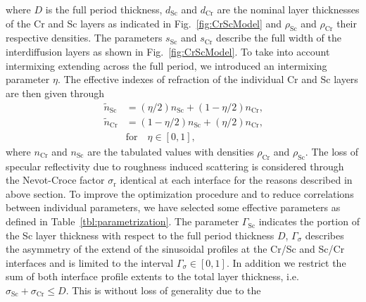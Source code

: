 where $D$ is the full period thickness, $d_\text{Sc}$ and $d_\text{Cr}$ are the nominal layer thicknesses of the Cr and Sc layers as indicated in Fig.~\ref{fig:CrScModel} and $\rho_\text{Sc}$ and $\rho_\text{Cr}$ their respective densities. The parameters $s_\text{Sc}$ and $s_\text{Cr}$ describe the full width of the interdiffusion layers as shown in Fig.~\ref{fig:CrScModel}. To take into account intermixing extending across the full period, we introduced an intermixing parameter $\eta$. The effective indexes of refraction of the individual Cr and Sc layers are then given through
\begin{align}
\tilde{n}_\text{Sc} &=(\eta/2) n_\text{Sc} + (1-\eta/2) n_\text{Cr} \text{,} \nonumber\\
\tilde{n}_\text{Cr} &=(1-\eta/2) n_\text{Sc} + (\eta/2) n_\text{Cr} \text{,} \label{eqn:effective_n} \\
&\text{for} \quad \eta \in [0,1] \text{,}\nonumber
\end{align}
where $n_\text{Cr}$ and $n_\text{Sc}$ are the tabulated values \cite{henke} with densities $\rho_\text{Cr}$ and $\rho_\text{Sc}$. The loss of specular reflectivity due to roughness induced scattering is considered through the Nevot-Croce factor $\sigma_\text{r}$ identical at each interface for the reasons described in above section. To improve the optimization procedure and to reduce correlations between individual parameters, we have selected some effective parameters as defined in Table~\ref{tbl:parametrization}. The parameter $\Gamma_\text{Sc}$ indicates the portion of the Sc layer thickness with respect to the full period thickness $D$, $\Gamma_\sigma$ describes the asymmetry of the extend of the sinusoidal profiles at the Cr/Sc and Sc/Cr interfaces and is limited to the interval $\Gamma_\sigma \in [0,1]$. In addition we restrict the sum of both interface profile extents to the total layer thickness, i.e.~$\sigma_\text{Sc} + \sigma_\text{Cr} \leq D$. This is without loss of generality due to the 
